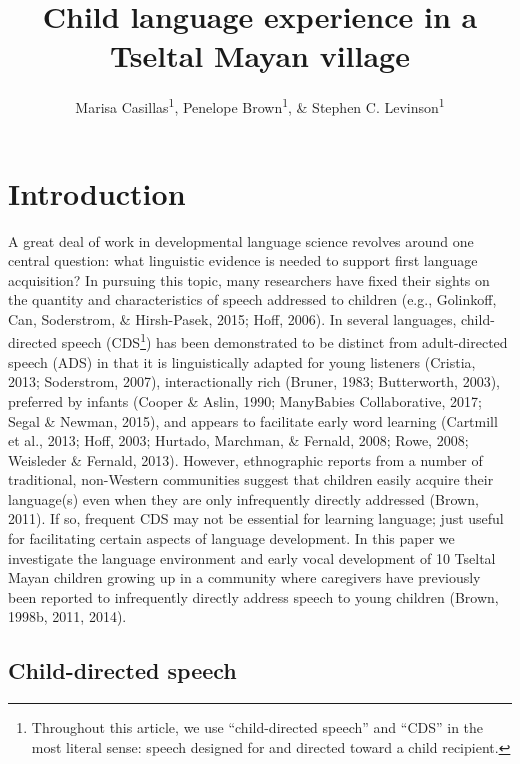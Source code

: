 \documentclass[floatsintext,man]{apa6}
\title{Child language experience in a Tseltal Mayan village}
\author{Marisa Casillas\textsuperscript{1}, Penelope Brown\textsuperscript{1}, \& Stephen C. Levinson\textsuperscript{1}}
\affiliation{
    \vspace{0.5cm}
          \textsuperscript{1} Max Planck Institute for Psycholinguistics  }
\theoremstyle{definition}
\theoremstyle{definition}
\theoremstyle{definition}
\theoremstyle{remark}
\begin{document}
\maketitle

\setcounter{secnumdepth}{0}



\section{Introduction}\label{intro}

A great deal of work in developmental language science revolves around
one central question: what linguistic evidence is needed to support
first language acquisition? In pursuing this topic, many researchers
have fixed their sights on the quantity and characteristics of speech
addressed to children (e.g., Golinkoff, Can, Soderstrom, \& Hirsh-Pasek,
2015; Hoff, 2006). In several languages, child-directed speech
(CDS\footnote{Throughout this article, we use \enquote{child-directed
  speech} and \enquote{CDS} in the most literal sense: speech designed
  for and directed toward a child recipient.}) has been demonstrated to
be distinct from adult-directed speech (ADS) in that it is
linguistically adapted for young listeners (Cristia, 2013; Soderstrom,
2007), interactionally rich (Bruner, 1983; Butterworth, 2003), preferred
by infants (Cooper \& Aslin, 1990; ManyBabies Collaborative, 2017; Segal
\& Newman, 2015), and appears to facilitate early word learning
(Cartmill et al., 2013; Hoff, 2003; Hurtado, Marchman, \& Fernald, 2008;
Rowe, 2008; Weisleder \& Fernald, 2013). However, ethnographic reports
from a number of traditional, non-Western communities suggest that
children easily acquire their language(s) even when they are only
infrequently directly addressed (Brown, 2011). If so, frequent CDS may
not be essential for learning language; just useful for facilitating
certain aspects of language development. In this paper we investigate
the language environment and early vocal development of 10 Tseltal Mayan
children growing up in a community where caregivers have previously been
reported to infrequently directly address speech to young children
(Brown, 1998b, 2011, 2014).

\subsection{Child-directed speech}\label{intro-cds}
\end{document}
